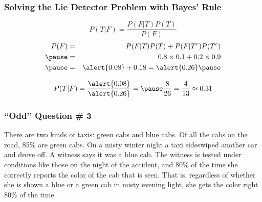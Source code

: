 \documentclass[handout]{beamer}
\begin{document}
\begin{frame}
\frametitle{Solving the Lie Detector Problem with Bayes' Rule}
\footnotesize
{}
\normalsize
\vspace{1em}
$$P(T|F) = \frac{P(F|T)P(T)}{P(F)}$$ \pause
\begin{eqnarray*}
	P(F) &=& P(F|T)P(T) + P(F|T^c)P(T^c)\\ \pause
		&=& 0.8 \times 0.1 + 0.2\times 0.9\\ \pause
		&=& \alert{0.08} + 0.18 = \alert{0.26} \pause
\end{eqnarray*}


$$P(T|F) = \frac{\alert{0.08}}{\alert{0.26}} = \pause \frac{8}{26} = \frac{4}{13} \approx 0.31$$
\end{frame}
\begin{frame}
\singlespacing
\frametitle{``Odd'' Question \# 3}


There are two kinds of taxis: green cabs and blue cabs. Of all the cabs on the road, \alert{85\% are green cabs}. On a misty winter night a taxi sideswiped another car and drove off. \alert{A witness says it was a blue cab.} The witness is tested under conditions like those on the night of the accident, and \alert{80\% of the time she correctly reports the color of the cab that is seen}. That is, regardless of whether she is shown a blue or a green cab in misty evening light, she gets the color right 80\% of the time. 

\vspace{1em}
\begin{center}
\end{center}

\end{frame}
\end{document}
